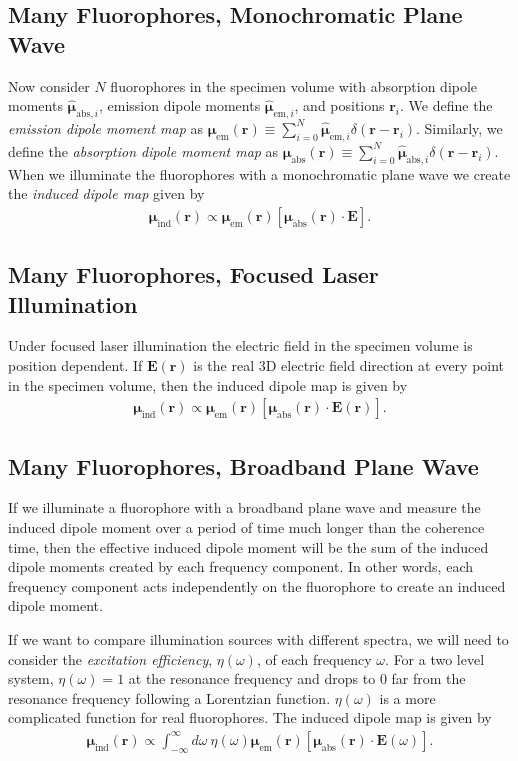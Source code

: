 \documentclass[11pt]{article}
\providecommand{\mb}[1]{\mathbf{#1}}
\providecommand{\bs}[1]{\boldsymbol{#1}}
\providecommand{\intinf}{\int_{-\infty}^{\infty}}
\begin{document}
\subsection{Many Fluorophores, Monochromatic Plane Wave}
Now consider $N$ fluorophores in the specimen volume with absorption dipole
moments $\hat{\bs{\mu}}_{\text{abs},i}$, emission dipole moments
$\hat{\bs{\mu}}_{\text{em},i}$, and positions $\mb{r}_i$. We define the
\textit{emission dipole moment map} as
$\bs{\mu}_{\text{em}}(\mb{r}) \equiv \sum_{i=0}^N \hat{\bs{\mu}}_{\text{em},i}
\delta (\mb{r} - \mb{r}_i)$. Similarly, we define the \textit{absorption dipole
  moment map} as
$\bs{\mu}_{\text{abs}}(\mb{r}) \equiv \sum_{i=0}^N \hat{\bs{\mu}}_{\text{abs},i}
\delta (\mb{r} - \mb{r}_i)$. When we illuminate the fluorophores with a
monochromatic plane wave we create the \textit{induced dipole map} given by
\begin{align}
    \bs{\mu}_{\text{ind}}(\mb{r}) \propto \bs{\mu}_{\text{em}}(\mb{r}) \left[\bs{\mu}_{\text{abs}}(\mb{r})\cdot \mb{E}\right].
\end{align}

\subsection{Many Fluorophores,  Focused Laser Illumination}
Under focused laser illumination the electric field in the specimen volume
is position dependent. If $\mb{E}(\mb{r})$ is the real 3D electric field
direction at every point in the specimen volume, then the induced dipole map is given
by
\begin{align}
    \bs{\mu}_{\text{ind}}(\mb{r}) \propto \bs{\mu}_{\text{em}}(\mb{r}) \left[\bs{\mu}_{\text{abs}}(\mb{r})\cdot \mb{E}(\mb{r})\right].
\end{align}

\subsection{Many Fluorophores, Broadband Plane Wave}
If we illuminate a fluorophore with a broadband plane wave and measure the
induced dipole moment over a period of time much longer than the coherence time,
then the effective induced dipole moment will be the sum of the induced dipole
moments created by each frequency component. In other words, each frequency
component acts independently on the fluorophore to create an induced dipole
moment.

If we want to compare illumination sources with different spectra, we will need
to consider the \textit{excitation efficiency}, $\eta(\omega)$, of each
frequency $\omega$. For a two level system, $\eta(\omega) = 1$ at the resonance
frequency and drops to 0 far from the resonance frequency following a Lorentzian
function. $\eta(\omega)$ is a more complicated function for real
fluorophores. The induced dipole map is given by
\begin{align}
    \bs{\mu}_{\text{ind}}(\mb{r}) \propto \intinf d\omega\ \eta(\omega) \bs{\mu}_{\text{em}}(\mb{r}) \left[\bs{\mu}_{\text{abs}}(\mb{r})\cdot \mb{E}(\omega)\right].
\end{align}
\end{document}
